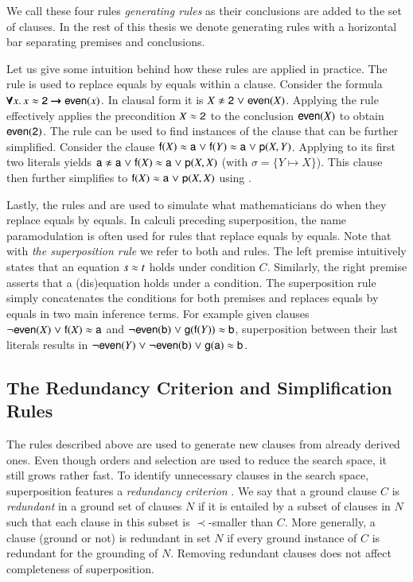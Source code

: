 \medskip
We call these four rules \emph{generating rules} as their conclusions are added to
the set of clauses. In the rest of this thesis we denote generating rules with a
horizontal bar separating premises and conclusions.

Let us give some intuition behind how these rules are applied in practice. The
 rule is used to replace equals by equals within a clause.
Consider the formula $\pmb{\forall} x.\,  x \approx \mathsf{2} \pmb{\rightarrow} \mathsf{even}(x)$. In
clausal form it is $X \noteq \cst{2} \llor \cst{even}(X)$. Applying the
 rule effectively applies the precondition $X \approx \mathsf{2}$ to the
conclusion $\mathsf{even}(X)$ to obtain $\mathsf{even}(\mathsf{2})$. The 
rule can be used to find instances of the clause that can be further simplified.
Consider the clause $\mathsf{f}(X) \approx \mathsf{a} \mathrel\lor \mathsf{f}(Y) \approx \mathsf{a} \mathrel\lor
\mathsf{p}(X, Y)$. Applying  to its first two literals yields $\cst{a}
\noteq \cst{a} \llor \cst{f}(X) \eq \cst{a} \llor \cst{p}(X, X)$ (with $\sigma = \{ Y \mapsto X \}$). This clause
then further simplifies to $\mathsf{f}(X) \approx \mathsf{a} \mathrel\lor \mathsf{p}(X, X)$ using .

Lastly, the rules  and  are used to simulate what
mathematicians do when they replace equals by equals. In calculi preceding
superposition, the name paramodulation is often used for rules that replace
equals by equals. Note that with \emph{the superposition rule} we refer to both
 and  rules. The left premise intuitively states that
an equation $s \approx t$ holds under condition $C$. Similarly, the right premise
asserts that a (dis)equation holds under a condition. The superposition rule
simply concatenates the conditions for both premises and replaces equals by
equals in two main inference terms. For example given clauses $\neg
\mathsf{even}(X) \mathrel\lor \mathsf{f}(X) \approx \mathsf{a}$ and $\neg \mathsf{even}(\mathsf{b}) \mathrel\lor
\mathsf{g}(\mathsf{f}(Y)) \approx \mathsf{b}$, superposition between their last literals
results in $\neg \mathsf{even}(Y) \mathrel\lor \neg \mathsf{even}(\mathsf{b}) \mathrel\lor
\mathsf{g}(\mathsf{a}) \approx \mathsf{b}$.

\medskip

\subsection{The Redundancy Criterion and Simplification Rules}

The rules described above are used to generate new clauses from already derived
ones. Even though orders and selection are used to reduce the search space,
it still grows rather fast. To identify unnecessary clauses in the search
space, superposition features a \emph{redundancy criterion}
\cite[Sect.~4.2.2]{bg-01-resolution}. We say that a ground clause $C$ is
{\em redundant} in a ground set of clauses $N$ if it is entailed by a subset of
clauses in $N$ such that each clause in this subset is $\prec$-smaller than $C$. More
generally, a clause (ground or not) is redundant in set $N$ if every ground
instance of $C$ is redundant for the grounding of $N$. Removing redundant
clauses does not affect completeness of superposition.

